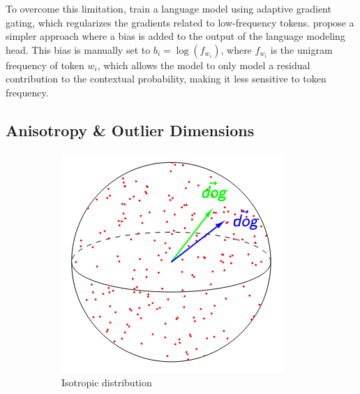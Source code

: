 To overcome this limitation, \citet{yu-etal-2022-rare} train a language model using adaptive gradient gating, which regularizes the gradients related to low-frequency tokens. \citet{meister-etal-2023-natural} propose a simpler approach where a bias is added to the output of the language modeling head. This bias is manually set to $b_i = \log(f_{w_i})$, where $f_{w_i}$ is the unigram frequency of token $w_i$, which allows the model to only model a residual contribution to the contextual probability, making it less sensitive to token frequency.

\subsection{Anisotropy \& Outlier Dimensions}


\begin{figure}[ht]
    \centering
    \begin{subfigure}[b]{0.3\textwidth}
        \includegraphics[width=\textwidth]{sources/related_works/imgs/anisotropy_kawin.png}
        \caption{Isotropic distribution}
        \label{fig:iso}
    \end{subfigure}
    \begin{subfigure}[b]{0.3\textwidth}

\end{subfigure}
\end{figure}
